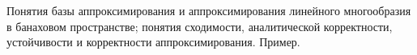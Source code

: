 \documentclass[__main__.tex]{subfiles}
\begin{document}
Понятия базы аппроксимирования и аппроксимирования линейного многообразия в банаховом пространстве; понятия сходимости, аналитической корректности, устойчивости и корректности аппроксимирования. Пример.
\end{document}
